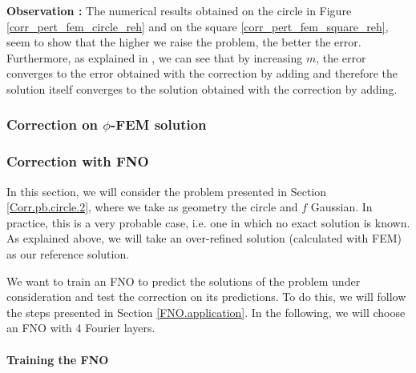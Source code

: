 	\textbf{Observation :} The numerical results obtained on the circle in Figure \ref{corr_pert_fem_circle_reh} and on the square \ref{corr_pert_fem_square_reh}, seem to show that the higher we raise the problem, the better the error. Furthermore, as explained in , we can see that by increasing $m$, the error converges to the error obtained with the correction by adding and therefore the solution itself converges to the solution obtained with the correction by adding. 


\subsubsection{Correction on $\phi$-FEM solution} \label{Corr.results.phifem}


\subsubsection{Correction with FNO} \label{Corr.results.FNO}


In this section, we will consider the problem presented in Section \ref{Corr.pb.circle.2}, where we take as geometry the circle and $f$ Gaussian. In practice, this is a very probable case, i.e. one in which no exact solution is known. As explained above, we will take an over-refined solution (calculated with FEM) as our reference solution. 

We want to train an FNO to predict the solutions of the problem under consideration and test the correction on its predictions. To do this, we will follow the steps presented in Section \ref{FNO.application}. In the following, we will choose an FNO with 4 Fourier layers.

\paragraph{Training the FNO} \label{Corr.results.FNO.Training}

